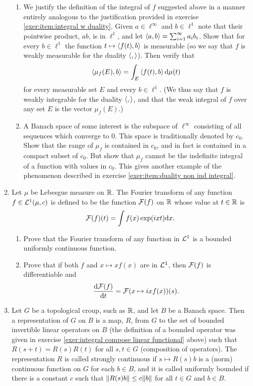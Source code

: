 \begin{enumerate}[label=\arabic*),ref=\arabic*]
\begin{enumerate}[label=\alph*)]
    \item We justify the definition of the integral of $f$ suggested above in a manner entirely analogous to the justification provided in exercise \ref{exer:item:integral w duality}. Given $a\in\ell^\infty$ and $b\in\ell^1$ note that their pointwise product, $ab$, is in $\ell^1$, and let $\left\langle a,b\right\rangle=\sum_{i=1}^\infty a_ib_i$. Show that for every $b\in\ell^1$ the function $t\mapsto\left\langle f(t),b\right\rangle$ is measurable (so we say that $f$ is weakly measurable for the duality $\left\langle,\right\rangle$). Then verify that $$\left\langle\mu_f(E), b\right\rangle=\int_E\left\langle f(t),b\right\rangle\dd\mu(t)$$ for every measurable set $E$ and every $b\in\ell^1$. (We thus say that $f$ is weakly integrable for the duality $\left\langle,\right\rangle$, and that the weak integral of $f$ over any set $E$ is the vector $\mu_f(E)$.)
    
    \item A Banach space of some interest is the subspace of $\ell^\infty$ consisting of all sequences which converge to 0. This space is traditionally denoted by $c_0$. Show that the range of $\mu_f$ is contained in $c_0$, and in fact is contained in a compact subset of $c_0$. But show that $\mu_f$ cannot be the indefinite integral of a function with values in $c_0$. This gives another example of the phenomenon described in exercise \ref{exer:item:duality non ind integral}.
\end{enumerate}

\item Let $\mu$ be Lebesgue measure on $\mathbb{R}$. The Fourier transform of any function $f\in{\cal L}^1(\mu,c)$ is defined to be the function ${\cal F}(f)$ on $\mathbb{R}$ whose value at $t\in\mathbb{R}$ is $${\cal F}(f)(t)=\int f(x)\exp(ixt)\dd x.$$
\begin{enumerate}[label=\alph*]
    \item Prove that the Fourier transform of any function in ${\cal L}^1$ is a bounded uniformly continuous function.

    \item Prove that if both $f$ and $x\mapsto xf(x)$ are in ${\cal L}^1$, then ${\cal F}(f)$ is differentiable and $$\dv{{\cal F}(f)}{t}(s)={\cal F}(x\mapsto ixf(x))(s).$$
\end{enumerate}

\item Let $G$ be a topological croup, such as $\mathbb{R}$, and let $B$ be a Banach space. Then a representation of $G$ on $B$ is a map, $R$, from $G$ to the set of bounded invertible linear operators on $B$ (the definition of a bounded operator was given in exercise \ref{exer:integral compose linear functional} above) such that $R(s+t)=R(s)R(t)$ for all $s,t\in G$ (composition of operators). The representation $R$ is called strongly continuous if $s\mapsto R(s)b$ is a (norm) continuous function on $G$ for each $b\in B$, and it is called uniformly bounded if there is a constant $c$ such that $\norm{R(s)b}\leq c\norm{b}$ for all $t\in G$ and $b\in B$.


\end{enumerate}
